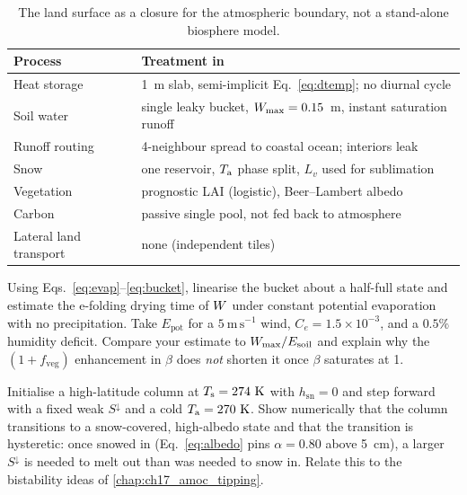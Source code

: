 \begin{table}[h]
\centering
\begin{tabular}{@{}ll@{}}
\toprule
Process & Treatment in \model{} \\
\midrule
Heat storage & 1~m slab, semi-implicit Eq.~\eqref{eq:dtemp}; no diurnal cycle \\
Soil water & single leaky bucket, $W_{\max}=0.15$~m, instant saturation runoff \\
Runoff routing & 4-neighbour spread to coastal ocean; interiors leak \\
Snow & one reservoir, $T_{\mathrm a}$ phase split, $L_v$ used for sublimation \\
Vegetation & prognostic LAI (logistic), Beer--Lambert albedo \\
Carbon & passive single pool, not fed back to atmosphere \\
Lateral land transport & none (independent tiles) \\
\bottomrule
\end{tabular}
\caption{The land surface as a closure for the atmospheric boundary, not a
stand-alone biosphere model.}
\end{table}

\begin{exercise}
Using Eqs.~\eqref{eq:evap}--\eqref{eq:bucket}, linearise the bucket about a
half-full state and estimate the e-folding drying time of $W$ under constant
potential evaporation with no precipitation. Take $E_{\mathrm{pot}}$ for a
$5\ \mathrm{m\,s^{-1}}$ wind, $C_e=1.5\times10^{-3}$, and a $0.5\%$ humidity
deficit. Compare your estimate to $W_{\max}/E_{\mathrm{soil}}$ and explain why the
$(1+f_{\mathrm{veg}})$ enhancement in $\beta$ does \emph{not} shorten it once
$\beta$ saturates at 1.
\end{exercise}

\begin{exercise}
Initialise a high-latitude column at $T_{\mathrm s}=274\ \mathrm{K}$ with
$h_{\mathrm{sn}}=0$ and step  forward with a fixed weak
$S^\downarrow$ and a cold $T_{\mathrm a}=270\ \mathrm{K}$. Show numerically that the
column transitions to a snow-covered, high-albedo state and that the transition
is hysteretic: once snowed in (Eq.~\eqref{eq:albedo} pins $\alpha=0.80$ above
5~cm), a larger $S^\downarrow$ is needed to melt out than was needed to snow in.
Relate this to the bistability ideas of \ref{chap:ch17_amoc_tipping}.
\end{exercise}

